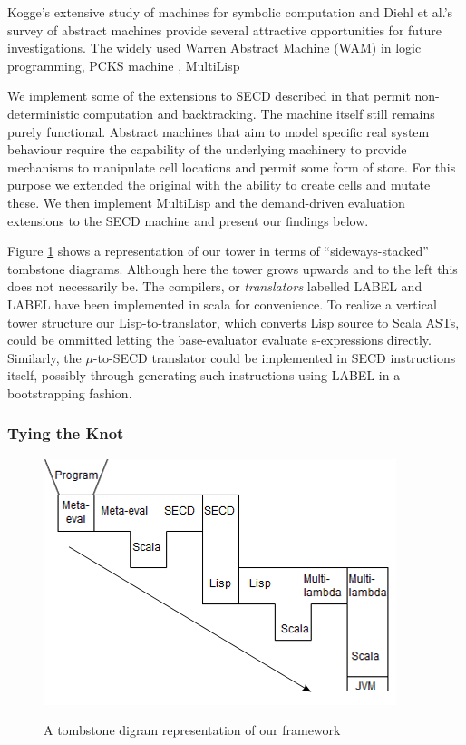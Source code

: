 \documentclass{article}
\theoremstyle{definition}
\begin{document}
Kogge's extensive study of machines for symbolic computation \cite{kogge1990architecture} and Diehl et al.'s survey of abstract machines provide several attractive opportunities for future investigations. The widely used Warren Abstract Machine (WAM) in logic programming, PCKS machine \cite{moreau1994pcks}, MultiLisp

We implement some of the extensions to SECD described in \cite{kogge1990architecture} that permit non-deterministic computation and backtracking. The machine itself still remains purely functional. Abstract machines that aim to model specific real system behaviour require the capability of the underlying machinery to provide mechanisms to manipulate cell locations and permit some form of store. For this purpose we extended the original \mslang with the ability to create cells and mutate these. We then implement MultiLisp and the demand-driven evaluation extensions to the SECD machine and present our findings below.

Figure \ref{fig:tombestone} shows a representation of our tower in terms of ``sideways-stacked'' tombstone diagrams. Although here the tower grows upwards and to the left this does not necessarily be. The compilers, or \textit{translators} labelled LABEL and LABEL have been implemented in scala for convenience. To realize a vertical tower structure our Lisp-to-\mslang translator, which converts Lisp source to Scala ASTs, could be ommitted letting the base-evaluator evaluate s-expressions directly. Similarly, the $\mu$-to-SECD translator could be implemented in SECD instructions itself, possibly through generating such instructions using LABEL in a bootstrapping fashion.

\subsubsection{Tying the Knot}

\begin{figure}[t]
\centering
\includegraphics[scale=2]{tombstone_tower.png}
\label{fig:tombestone}
\caption{A tombstone digram representation of our framework}
\end{figure}
\end{document}
